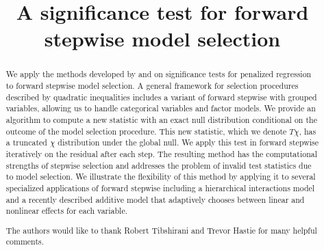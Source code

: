 \documentclass{imsart}
\begin{document}
\begin{frontmatter}

\title{A significance test for forward stepwise model selection}


\author{ 
\and {} }


\address{Department of Statistics\\  Stanford University\\ Sequoia
Hall \\390 Serra Mall\\ Stanford, CA 94305, U.S.A.\\ }


\begin{abstract}
  We apply the methods developed by \cite{significance:lasso} and
  \cite{tests:adaptive} on significance tests for penalized
  regression to forward stepwise model selection. A general framework
  for selection procedures described by quadratic inequalities includes
  a variant of forward stepwise with grouped variables, allowing us to
  handle categorical variables and factor models. We provide an algorithm
  to compute a new statistic with an exact null distribution conditional
  on the outcome of the model selection procedure. This new
  statistic, which we denote $T\chi$,
  has a truncated $\chi$ distribution under the global null.
  We apply this test in forward stepwise iteratively on the residual after
  each step. The resulting method
  has the computational strengths of stepwise selection and addresses
  the problem of invalid test statistics due to model selection.
  We illustrate the flexibility of this method by applying it to
  several specialized applications of forward stepwise including a
  hierarchical interactions model and a recently described additive model
  that adaptively chooses between linear and nonlinear effects for
  each variable. 
\end{abstract}

\renewcommand{\abstractname}{Acknowledgements}
\begin{abstract}
The authors would like to thank Robert Tibshirani and Trevor Hastie for many helpful comments.
\end{abstract}


\end{frontmatter}
\end{document}
